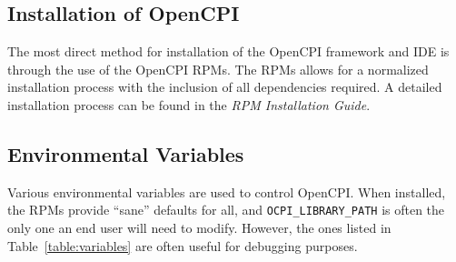 \subsection{Installation of OpenCPI}
The most direct method for installation of the OpenCPI framework and IDE is through the use of the OpenCPI RPMs. The RPMs allows for a normalized installation process with the inclusion of all dependencies required. A detailed installation process can be found in the \textit{RPM Installation Guide}.

\begin{center}
\end{center}

\subsection{Environmental Variables}
Various environmental variables are used to control OpenCPI. When installed, the RPMs provide ``sane'' defaults for all, and \verb+OCPI_LIBRARY_PATH+ is often the only one an end user will need to modify. However, the ones listed in Table~\ref{table:variables} are often useful for debugging purposes.

